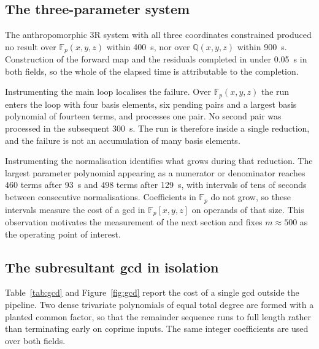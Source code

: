 \documentclass[11pt,a4paper]{article}
\theoremstyle{plain}
\theoremstyle{definition}
\theoremstyle{remark}
\newcommand{\FF}{\mathbb{F}}
\newcommand{\QQ}{\mathbb{Q}}
\begin{document}
\subsection{The three-parameter system}
\label{sec:three}

The anthropomorphic 3R system with all three coordinates constrained produced no result over
$\FF_p(x,y,z)$ within \SI{400}{\second}, nor over $\QQ(x,y,z)$ within \SI{900}{\second}. Construction
of the forward map and the residuals completed in under \SI{0.05}{\second} in both fields, so the
whole of the elapsed time is attributable to the completion.

Instrumenting the main loop localises the failure. Over $\FF_p(x,y,z)$ the run enters the loop with
four basis elements, six pending pairs and a largest basis polynomial of fourteen terms, and processes
one pair. No second pair was processed in the subsequent \SI{300}{\second}. The run is therefore
inside a single reduction, and the failure is not an accumulation of many basis elements.

Instrumenting the normalisation identifies what grows during that reduction. The largest parameter
polynomial appearing as a numerator or denominator reaches $460$ terms after \SI{93}{\second} and
$498$ terms after \SI{129}{\second}, with intervals of tens of seconds between consecutive
normalisations. Coefficients in $\FF_p$ do not grow, so these intervals measure the cost of a gcd in
$\FF_p[x,y,z]$ on operands of that size. This observation motivates the measurement of the next
section and fixes $m \approx 500$ as the operating point of interest.

\subsection{The subresultant gcd in isolation}
\label{sec:gcd}

Table~\ref{tab:gcd} and Figure~\ref{fig:gcd} report the cost of a single gcd outside the pipeline. Two
dense trivariate polynomials of equal total degree are formed with a planted common factor, so that
the remainder sequence runs to full length rather than terminating early on coprime inputs. The same
integer coefficients are used over both fields.
\end{document}
